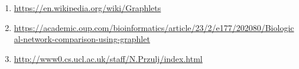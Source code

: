 \documentclass{article}
\begin{document}
\begin{enumerate}
    \item \url{https://en.wikipedia.org/wiki/Graphlets}
    \item \url{https://academic.oup.com/bioinformatics/article/23/2/e177/202080/Biological-network-comparison-using-graphlet}
    \item \url{http://www0.cs.ucl.ac.uk/staff/N.Przulj/index.html}
\end{enumerate}



\end{document}
